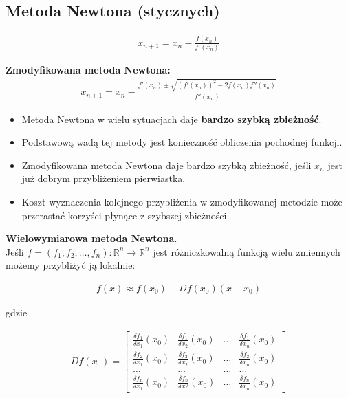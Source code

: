 \documentclass[main.tex]{subfiles}
\begin{document}
    \subsection{Metoda Newtona (stycznych)}

    \begin{align*}
        x_{n+1} = x_n - \frac{f(x_n)}{f'(x_n)}
    \end{align*}

    \textbf{Zmodyfikowana metoda Newtona:}
    \begin{align*}
        x_{n+1} = x_n - \frac{f'(x_n) \pm \sqrt{(f'(x_n))^2 - 2f(x_n)f''(x_n)}}{f''(x_n)}
    \end{align*}


    \begin{itemize}
        \item Metoda Newtona w wielu sytuacjach daje \textbf{bardzo szybką zbieżność}.
        \item Podstawową wadą tej metody jest konieczność obliczenia pochodnej funkcji.
        \item Zmodyfikowana metoda Newtona daje bardzo szybką zbieżność, jeśli $x_n$ jest już dobrym przybliżeniem
        pierwiastka.
        \item Koszt wyznaczenia kolejnego przybliżenia w zmodyfikowanej metodzie może przerastać korzyści płynące
        z szybszej zbieżności.
    \end{itemize}

    \textbf{Wielowymiarowa metoda Newtona}.\\

    Jeśli $f = (f_1, f_2, \dots, f_n): \mathbb{R}^n \rightarrow \mathbb{R}^n$ jest różniczkowalną funkcją wielu zmiennych
    możemy przybliżyć ją lokalnie:

    \begin{align*}
        f(x) \approx f(x_0) + Df(x_0)(x - x_0)
    \end{align*}

    gdzie

    \begin{align*}
        Df(x_0) =
        \begin{bmatrix}
            \frac{\delta f_1}{\delta x_1}(x_0) & \frac{\delta f_1}{\delta x_2}(x_0) & \dots & \frac{\delta f_1}{\delta x_n}(x_0)\\
            \frac{\delta f_2}{\delta x_1}(x_0) & \frac{\delta f_2}{\delta x_2}(x_0) & \dots & \frac{\delta f_2}{\delta x_n}(x_0)\\
            \dots & \dots & \dots & \dots\\
            \frac{\delta f_n}{\delta x_1}(x_0) & \frac{\delta f_n}{\delta x2}(x_0) & \dots & \frac{\delta f_n}{\delta x_n}(x_0)
        \end{bmatrix}
    \end{align*}
\end{document}
